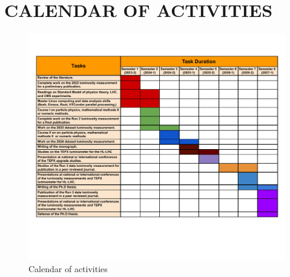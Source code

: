 \documentclass[final,12p]{article}
\begin{document}
\section{CALENDAR OF ACTIVITIES}
\begin{figure}[H]
  \centering
  \includegraphics[width=\columnwidth]{./calendario.pdf}
  \caption{ Calendar of activities }
  \label{fig:calendario}
\end{figure}
\end{document}
